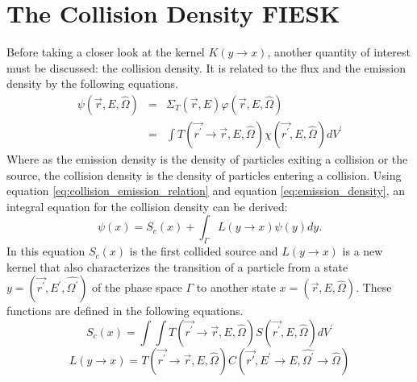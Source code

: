 \section{The Collision Density FIESK}
Before taking a closer look at the kernel $K(y \to x)$, another quantity of 
interest must be discussed: the collision density. It is related to the
flux and the emission density by the following equations.
\begin{eqnarray}
  \psi(\vec{r},E,\hat{\Omega}) & = & \Sigma_T(\vec{r},E)
  \varphi(\vec{r},E,\hat{\Omega}) \\
  & = & \int T(\vec{r^{'}} \to \vec{r},E,\hat{\Omega})
  \chi(\vec{r^{'}},E,\hat{\Omega})dV^{'}
  \label{eq:collision_emission_relation}
\end{eqnarray}
Where as the emission density is the density of particles exiting a collision
or the source, the collision density is the density of particles entering a 
collision. Using equation \ref{eq:collision_emission_relation} and equation
\ref{eq:emission_density}, an integral equation for the 
collision density can be derived:
\begin{equation*}
  \psi(x) = S_c(x) + \int_{\Gamma} L(y \to x)\psi(y)dy.
\end{equation*}
In this equation $S_c(x)$ is the first collided source and $L(y \to x)$ is
a new kernel that also characterizes the transition of a particle from a state 
$y = (\vec{r^{'}},E^{'},\hat{\Omega^{'}})$ of the phase space $\Gamma$ to another 
state $x = (\vec{r},E,\hat{\Omega})$. These functions are defined in the 
following equations.
\begin{equation}
  S_c(x) = \int\int T(\vec{r^{'}} \to \vec{r},E,\hat{\Omega})
  S(\vec{r^{'}},E,\hat{\Omega})dV^{'}
\end{equation}
\begin{equation}
  L(y \to x) =
  T(\vec{r^{'}} \to \vec{r},E,\hat{\Omega})
  C(\vec{r'},E^{'} \to E,\hat{\Omega^{'}} \to \hat{\Omega})
\end{equation}

